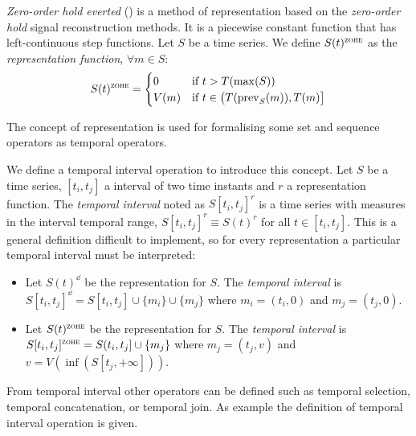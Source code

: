 \begin{definition}
  \emph{Zero-order hold everted} (\zohe{}) is a method of
  representation based on the \emph{zero-order hold} signal
  reconstruction methods. It is a piecewise constant function that has
  left-continuous step functions.  Let $S$ be a time series. We define
  $S(t)^\zohe$ as the \emph{\zohe{} representation function}, $\forall
  m \in S:$
\[
    S(t)^\zohe 
    = \begin{cases}
      0 & \text{if }  t > T(\max(S)) \\
      V(m) & \text{if } t\in \big(T(\prev_S(m)),T(m)\big]
    \end{cases}
\]
\end{definition}




The concept of representation is used for formalising some set and
sequence operators as temporal operators. 



We define a temporal interval operation to introduce this concept.
Let $S$ be a time series, $[t_i,t_j]$ a interval of two time instants
and $r$ a representation function. The \emph{temporal interval} noted
as $S[t_i,t_j]^r$ is a time series with measures in the interval
temporal range, $S[t_i,t_j]^r\equiv S(t)^r$ for all $t \in [t_i,t_j]$. This
is a general definition difficult to implement, so for every
representation a particular temporal interval must be interpreted:

\begin{itemize}
\item Let $S(t)^\dd$ be the \dd{} representation for $S$. The
  \emph{\dd{} temporal interval} is $S[t_i,t_j]^\dd = S[t_i,t_j]
  \cup \{m_i\} \cup \{m_j\}$ where $m_i=(t_i,0)$ and $m_j=(t_j,0)$.

\item Let $S(t)^\zohe{}$ be the \zohe{} representation for $S$. The
  \emph{\zohe{} temporal interval} is $S[t_i,t_j]^\zohe{} = S(t_i,t_j]
  \cup \{m_j\}$ where $m_j=(t_j,v)$ and $v= V(\inf( S[t_j,+\infty] ))$.
\end{itemize}



From temporal interval other operators can be defined such as temporal
selection, temporal concatenation, or temporal join. As example the
definition of temporal interval operation is given.


